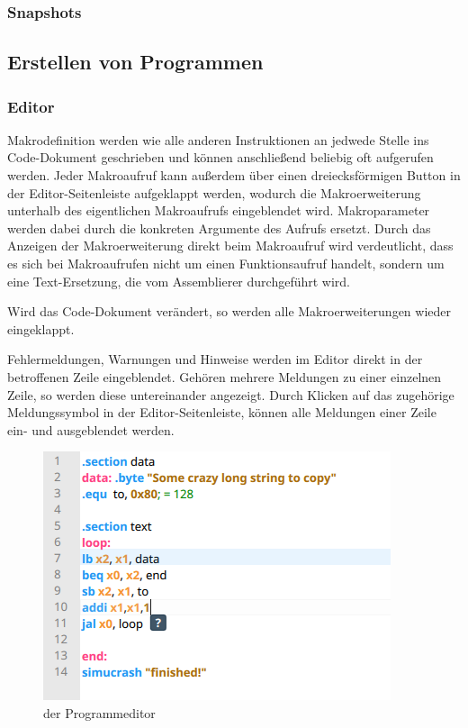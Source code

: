 \subsubsection{Snapshots}


\subsection{Erstellen von Programmen}

\subsubsection{Editor}
Makrodefinition werden wie alle anderen Instruktionen an jedwede Stelle ins Code-Dokument geschrieben und können anschließend beliebig oft aufgerufen werden. Jeder Makroaufruf kann außerdem über einen dreiecksförmigen Button in der Editor-Seitenleiste aufgeklappt werden, wodurch die Makroerweiterung unterhalb des eigentlichen Makroaufrufs eingeblendet wird. Makroparameter werden dabei durch die konkreten Argumente des Aufrufs ersetzt. Durch das Anzeigen der Makroerweiterung direkt beim Makroaufruf wird verdeutlicht, dass es sich bei Makroaufrufen nicht um einen Funktionsaufruf handelt, sondern um eine Text-Ersetzung, die vom Assemblierer durchgeführt wird.

Wird das Code-Dokument verändert, so werden alle Makroerweiterungen wieder eingeklappt.

Fehlermeldungen, Warnungen und Hinweise werden im Editor direkt in der betroffenen Zeile eingeblendet. Gehören mehrere Meldungen zu einer einzelnen Zeile, so werden diese untereinander angezeigt. Durch Klicken auf das zugehörige Meldungssymbol in der Editor-Seitenleiste, können alle Meldungen einer Zeile ein- und ausgeblendet werden.

\begin{figure}[ht]
	\centering
  \includegraphics[scale=1]{Images/Editor}
	\caption{der Programmeditor}
	\label{Editor}
\end{figure}


